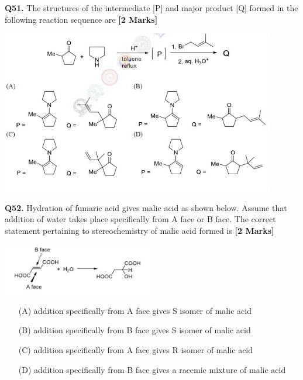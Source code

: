 \documentclass[11pt]{article}
\newcommand{\questionb}[2]{
    \noindent\textbf{Q#2.} #1 \hfill \textbf{[2 Marks]}
}
\begin{document}
\questionb{The structures of the intermediate [P] and major product [Q] formed in the following reaction sequence are}{51}
\begin{center}
\includegraphics[width=0.9\textwidth]{figures/51.png}
\end{center}
\vspace{0.5cm}

\questionb{Hydration of fumaric acid gives malic acid as shown below. Assume that addition of water takes place specifically from A face or B face. The correct statement pertaining to stereochemistry of malic acid formed is}{52}
\begin{center}
\includegraphics[width=0.5\textwidth]{figures/52.png}
\end{center}
\begin{enumerate}
    \item[(A)] addition specifically from A face gives S isomer of malic acid
    \item[(B)] addition specifically from B face gives S isomer of malic acid
    \item[(C)] addition specifically from A face gives R isomer of malic acid
    \item[(D)] addition specifically from B face gives a racemic mixture of malic acid
\end{enumerate}
\vspace{0.5cm}
\end{document}
